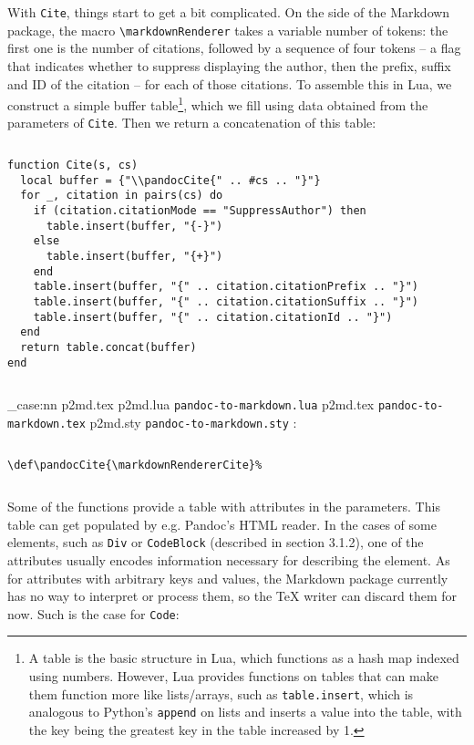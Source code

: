 \documentclass[
  digital,     %
  oneside,     %
  nosansbold,  %
  nocolorbold, %
  lof,         %
  nolot,       %
]{fithesis4}
\newcommand\macro[1]{\texttt{\textbackslash{}{#1}}}
\newcommand\renderer[1]{\macro{markdown\-Renderer\-{#1}}}
\newcommand\file[1]
  {
    \str_case:nn
      { #1 }
      {
        { p2md.lua } { \texttt{pandoc\hyp{}to\hyp{}markdown.lua} }
        { p2md.tex } { \texttt{pandoc\hyp{}to\hyp{}markdown.tex} }
        { p2md.sty } { \texttt{pandoc\hyp{}to\hyp{}markdown.sty} }
      }
  }
\begin{document}
\noindent
With \texttt{Cite}, things start to get a bit complicated. On the side of the Markdown package, the macro \renderer{Cite} takes a variable number of tokens: the first one is the number of citations, followed by a sequence of four tokens -- a flag that indicates whether to suppress displaying the author, then the prefix, suffix and ID of the citation -- for each of those citations. To assemble this in Lua, we construct a simple buffer table\footnote{A table is the basic structure in Lua, which functions as a hash map indexed using numbers. However, Lua provides functions on tables that can make them function more like lists/arrays, such as \texttt{table.insert}, which is analogous to Python's \texttt{append} on lists and inserts a value into the table, with the key being the greatest key in the table increased by 1.}, which we fill using data obtained from the parameters of \texttt{Cite}. Then we return a concatenation of this table:

$ $

\noindent
\lstset{language=[5.3]Lua}
\begin{lstlisting}
function Cite(s, cs)
  local buffer = {"\\pandocCite{" .. #cs .. "}"}
  for _, citation in pairs(cs) do
    if (citation.citationMode == "SuppressAuthor") then
      table.insert(buffer, "{-}")
    else
      table.insert(buffer, "{+}")
    end
    table.insert(buffer, "{" .. citation.citationPrefix .. "}")
    table.insert(buffer, "{" .. citation.citationSuffix .. "}")
    table.insert(buffer, "{" .. citation.citationId .. "}")
  end
  return table.concat(buffer)
end
\end{lstlisting}

$ $

\noindent
\file{p2md.tex}:

$ $

\noindent
\lstset{language=[plain]TeX}
\begin{lstlisting}
\def\pandocCite{\markdownRendererCite}%
\end{lstlisting}

$ $

\noindent
Some of the functions provide a table with attributes in the parameters. This table can get populated by e.g. Pandoc's HTML reader. In the cases of some elements, such as \texttt{Div} or \texttt{CodeBlock} (described in section 3.1.2), one of the attributes usually encodes information necessary for describing the element. As for attributes with arbitrary keys and values, the Markdown package currently has no way to interpret or process them, so the \TeX{} writer can discard them for now. Such is the case for \texttt{Code}:
\end{document}

